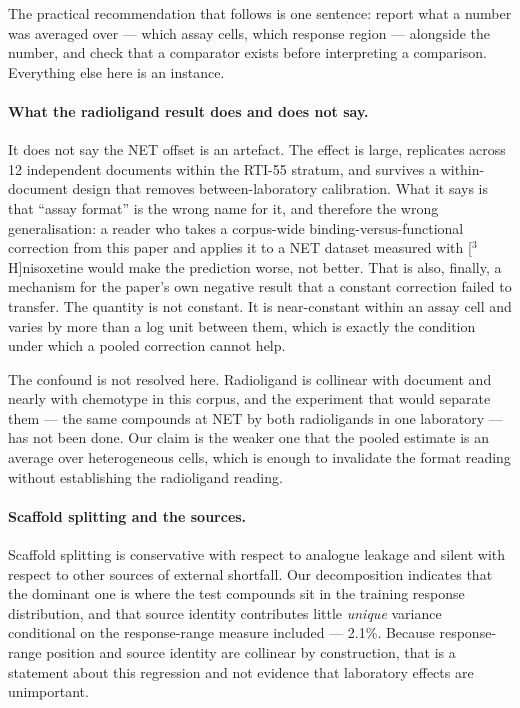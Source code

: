 \documentclass[11pt,a4paper]{article}
\begin{document}
The practical recommendation that follows is one sentence: report what a number was
averaged over --- which assay cells, which response region --- alongside the number, and
check that a comparator exists before interpreting a comparison. Everything else here is
an instance.

\paragraph{What the radioligand result does and does not say.} It does not say the NET
offset is an artefact. The effect is large, replicates across 12 independent documents
within the RTI-55 stratum, and survives a within-document design that removes
between-laboratory calibration. What it says is that ``assay format'' is the wrong name
for it, and therefore the wrong generalisation: a reader who takes a corpus-wide
binding-versus-functional correction from this paper and applies it to a NET dataset
measured with [$^{3}$H]nisoxetine would make the prediction worse, not better. That is
also, finally, a mechanism for the paper's own negative result that a constant correction
failed to transfer. The quantity is not constant. It is near-constant within an assay cell
and varies by more than a log unit between them, which is exactly the condition under
which a pooled correction cannot help.

The confound is not resolved here. Radioligand is collinear with document and nearly with
chemotype in this corpus, and the experiment that would separate them --- the same
compounds at NET by both radioligands in one laboratory --- has not been done. Our claim
is the weaker one that the pooled estimate is an average over heterogeneous cells, which
is enough to invalidate the format reading without establishing the radioligand reading.

\paragraph{Scaffold splitting and the sources.} Scaffold splitting is conservative with
respect to analogue leakage and silent with respect to other sources of external
shortfall. Our decomposition indicates that the dominant one is where the test compounds
sit in the training response distribution, and that source identity contributes little
\emph{unique} variance conditional on the response-range measure included --- 2.1\%.
Because response-range position and source identity are collinear by construction, that is
a statement about this regression and not evidence that laboratory effects are
unimportant.
\end{document}
